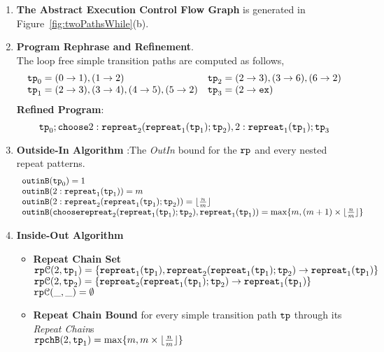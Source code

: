 \begin{enumerate}
  \item  \textbf{The Abstract Execution Control Flow Graph} is generated in Figure~\ref{fig:twoPathsWhile}(b).

  \item \textbf{Program Rephrase and Refinement}. 
  \\
  The loop free simple transition paths are computed as follows,
  \[
    \begin{array}{ll}
\mathtt{tp}_0 = (0 \to 1), (1 \to 2)
&
\mathtt{tp}_2 = (2 \to 3), (3 \to 6), (6 \to 2)
\\
\mathtt{tp}_1 = (2 \to 3), (3 \to 4), (4 \to 5), (5 \to 2)
&
\mathtt{tp}_3 = (2 \to \mathtt{ex})
\end{array}
\]
\textbf{Refined Program}:
\[
  \mathtt{tp}_0 ; \mathtt{choose}{2: \mathtt{repreat}_2(\mathtt{repreat}_1(\mathtt{tp}_1); \mathtt{tp}_2) , 
  2: \mathtt{repreat}_1(\mathtt{tp}_1) }; \mathtt{tp}_3
  \]
  \item \textbf{Outside-In Algorithm} :The \emph{OutIn} bound for the $\mathtt{rp}$ and every nested repeat patterns.
  \[
    \begin{array}{l}
        \mathtt{outinB}(\mathtt{tp}_0) = 1
        \\
        \mathtt{outinB}(2: \mathtt{repreat}_1(\mathtt{tp}_1)) = m 
        \\
        \mathtt{outinB}(2: \mathtt{repreat}_2(\mathtt{repreat}_1(\mathtt{tp}_1); \mathtt{tp}_2)) = \lfloor\frac{n}{m}\rfloor
        \\
        \mathtt{outinB}(\mathtt{choose}{\mathtt{repreat}_2(\mathtt{repreat}_1(\mathtt{tp}_1); \mathtt{tp}_2), \mathtt{repreat}_1(\mathtt{tp}_1) })
        = \max\{m, (m  + 1)\times \lfloor\frac{n}{m}\rfloor\}
\end{array}
\]
\item \textbf{Inside-Out Algorithm}
\begin{itemize}
  \item \textbf{Repeat Chain Set}
  \\
  $\mathtt{rp}\mathcal{C}(2, \mathtt{tp}_1) = \{\mathtt{repreat}_1(\mathtt{tp}_1), \mathtt{repreat}_2(\mathtt{repreat}_1(\mathtt{tp}_1); \mathtt{tp}_2) \to \mathtt{repreat}_1(\mathtt{tp}_1)\}$ \\
  $\mathtt{rp}\mathcal{C}(2, \mathtt{tp}_2) = \{\mathtt{repreat}_2(\mathtt{repreat}_1(\mathtt{tp}_1); \mathtt{tp}_2) \to \mathtt{repreat}_1(\mathtt{tp}_1)\}$ \\
  $\mathtt{rp}\mathcal{C}(\_, \_) = \emptyset$ 
  \item \textbf{Repeat Chain Bound} for every simple transition path $\mathtt{tp}$ through its \emph{Repeat Chain}s
  \\
  $\mathtt{rpchB}(2, \mathtt{tp}_1) = \max\{m, m \times \lfloor\frac{n}{m}\rfloor\}$ \\

\end{itemize}
\end{enumerate}

